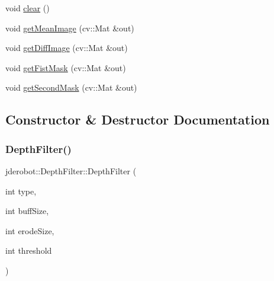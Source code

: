 \begin{DoxyCompactItemize}
\item 
void \hyperlink{classjderobot_1_1_depth_filter_a89460a33c77663365cdaac29f3e06e9a}{clear} ()
\item 
void \hyperlink{classjderobot_1_1_depth_filter_a3ec6d1a0731ddbc235eacff6bae7970c}{get\+Mean\+Image} (cv\+::\+Mat \&out)
\item 
void \hyperlink{classjderobot_1_1_depth_filter_a726764bf1ca8f8f765507b32870ed8ee}{get\+Diff\+Image} (cv\+::\+Mat \&out)
\item 
void \hyperlink{classjderobot_1_1_depth_filter_a6667315ceee0a6abba42840d29b848d3}{get\+Fist\+Mask} (cv\+::\+Mat \&out)
\item 
void \hyperlink{classjderobot_1_1_depth_filter_a1e69ca9fd83391b8fb89d4ae4df35262}{get\+Second\+Mask} (cv\+::\+Mat \&out)
\end{DoxyCompactItemize}


\subsection{Constructor \& Destructor Documentation}
\mbox{\label{classjderobot_1_1_depth_filter_a5f1717aa509c378e2124f9ab86dfe584}} 
\subsubsection{\texorpdfstring{Depth\+Filter()}{DepthFilter()}\hspace{0.1cm}{\footnotesize\ttfamily [1/2]}}
{\footnotesize\ttfamily jderobot\+::\+Depth\+Filter\+::\+Depth\+Filter (\begin{DoxyParamCaption}\item[{int}]{type,  }\item[{int}]{buff\+Size,  }\item[{int}]{erode\+Size,  }\item[{int}]{threshold }\end{DoxyParamCaption})}

\mbox{\label{classjderobot_1_1_depth_filter_afd0b86c3f0bf4328025ee4f92934f564}} 
